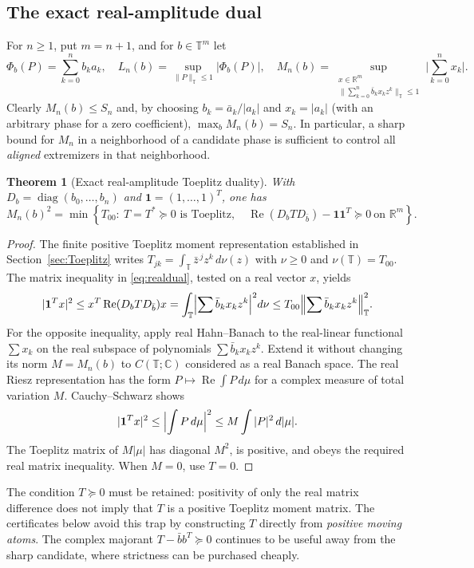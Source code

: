 \documentclass[11pt]{article}
\newtheorem{theorem}{Theorem}[section]
\newcommand{\T}{\mathbb T}
\newcommand{\C}{\mathbb C}
\newcommand{\R}{\mathbb R}
\newcommand{\diag}{\operatorname{diag}}
\DeclareMathOperator{\Rea}{Re}
\begin{document}
\subsection{The exact real-amplitude dual}\label{sec:realdual}

For $n\ge1$, put $m=n+1$, and for $b\in\T^m$ let
\[
 \Phi_b(P)=\sum_{k=0}^n b_ka_k,\quad L_n(b)=\sup_{\|P\|_\T\le1}|\Phi_b(P)|,
 \quad M_n(b)=\sup_{\substack{x\in\R^m\\\|\sum_{k=0}^n\bar b_kx_kz^k\|_\T\le1}}\biggl|\sum_{k=0}^n x_k\biggr|.
\]
Clearly $M_n(b)\le S_n$ and, by choosing $b_k=\bar a_k/|a_k|$ and $x_k=|a_k|$ (with an arbitrary phase for a zero coefficient), $\max_b M_n(b)=S_n$.  In particular, a sharp bound for $M_n$ in a neighborhood of a candidate phase is sufficient to control all \emph{aligned} extremizers in that neighborhood.

\begin{theorem}[Exact real-amplitude Toeplitz duality]\label{thm:realdual}
With $D_b=\diag(b_0,\ldots,b_n)$ and $\mathbf1=(1,\ldots,1)^T$, one has
\begin{equation}\label{eq:realdual}
 M_n(b)^2=\min\left\{T_{00}:\ T=T^*\succeq0\text{ is Toeplitz},\quad
 \Rea(D_bTD_{\bar b})-\mathbf1\mathbf1^T\succeq0\ \text{on }\R^m\right\}.
\end{equation}
\end{theorem}
\begin{proof}
The finite positive Toeplitz moment representation established in Section~\ref{sec:Toeplitz} writes $T_{jk}=\int_\T\bar z^{\,j}z^k\,d\nu(z)$ with $\nu\ge0$ and $\nu(\T)=T_{00}$.  The matrix inequality in \eqref{eq:realdual}, tested on a real vector $x$, yields
\[
 |\mathbf1^Tx|^2\le x^T\Rea(D_bTD_{\bar b})x
 =\int_\T\Bigl|\sum\bar b_kx_kz^k\Bigr|^2d\nu
 \le T_{00}\Bigl\|\sum\bar b_kx_kz^k\Bigr\|_\T^2.
\]
For the opposite inequality, apply real Hahn--Banach to the real-linear functional $\sum x_k$ on the real subspace of polynomials $\sum\bar b_kx_kz^k$.  Extend it without changing its norm $M=M_n(b)$ to $C(\T;\C)$ considered as a real Banach space.  The real Riesz representation has the form $P\mapsto\Rea\int P\,d\mu$ for a complex measure of total variation $M$.  Cauchy--Schwarz shows
\[
 |\mathbf1^Tx|^2\le \Bigl|\int P\,d\mu\Bigr|^2
 \le M\int |P|^2\,d|\mu|.
\]
The Toeplitz matrix of $M|\mu|$ has diagonal $M^2$, is positive, and obeys the required real matrix inequality.  When $M=0$, use $T=0$.
\end{proof}

The condition $T\succeq0$ must be retained: positivity of only the real matrix difference does not imply that $T$ is a positive Toeplitz moment matrix.  The certificates below avoid this trap by constructing $T$ directly from \emph{positive moving atoms}.  The complex majorant $T-\bar b b^T\succeq0$ continues to be useful away from the sharp candidate, where strictness can be purchased cheaply.
\end{document}
